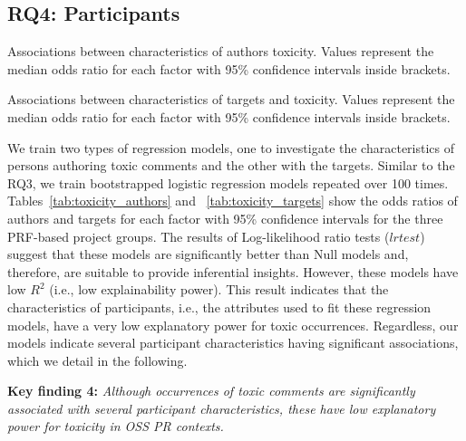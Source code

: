 \subsection{RQ4: Participants}
\label{sec:res-rq4}
\begin{table*}
    \caption{{Associations between characteristics of authors toxicity. Values represent the median odds ratio for each factor with 95\% confidence intervals inside brackets.}}
    \label{tab:toxicity_authors}
    \centering
    
\end{table*}





  
\begin{table*}
    \caption{{Associations between characteristics of targets and toxicity. Values represent the median odds ratio for each factor with 95\% confidence intervals inside brackets.}}
    \label{tab:toxicity_targets}
    \centering

\end{table*}




We train two types of regression models, one to investigate the characteristics of persons authoring toxic comments and the other with the targets. Similar to the RQ3, we train bootstrapped logistic regression models repeated over 100 times. Tables~\ref{tab:toxicity_authors} and ~\ref{tab:toxicity_targets} show the odds ratios of authors and targets for each factor with 95\% confidence intervals for the three PRF-based project groups. The results of Log-likelihood ratio tests ($lrtest$) suggest that these models are significantly better than Null models and, therefore, are suitable to provide inferential insights. However, these models have low $R^2$ (i.e., low explainability power). This result indicates that the characteristics of participants, i.e., the attributes used to fit these regression models, have a very low explanatory power for toxic occurrences. Regardless, our models indicate several participant characteristics having significant associations, which we detail in the following.




\begin{boxedtext}
\textbf{Key finding  4:} \emph{
Although occurrences of toxic comments are significantly associated with several participant characteristics, these have low explanatory power for toxicity in OSS PR contexts.}
\end{boxedtext}

